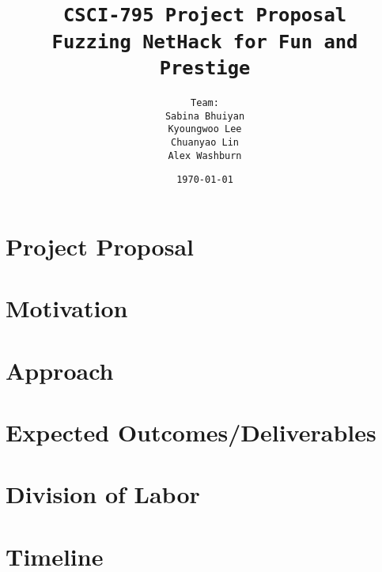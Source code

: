 \documentclass[12pt]{diazessay}
\title{\texttt{\huge{CSCI-795 Project Proposal} \\\vspace*{3mm} {\normalsize Fuzzing NetHack for Fun and Prestige}}} %
\author{\texttt{{\Huge Team:}\\ Sabina Bhuiyan \\ Kyoungwoo Lee \\ Chuanyao Lin \\ Alex Washburn}} %
\date{\texttt{\today}} %
\begin{document}
\maketitle %

\section*{Project Proposal}

\section*{Motivation}

\section*{Approach}

\section*{Expected Outcomes/Deliverables}

\section*{Division of Labor}

\section*{Timeline}
\end{document}
